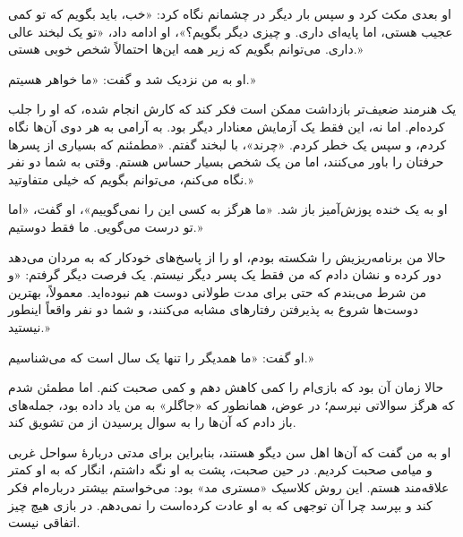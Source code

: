 او بعدی مکث کرد و سپس بار دیگر در چشمانم نگاه کرد: «خب، باید بگویم که تو کمی عجیب هستی، اما پایه‌ای داری. و چیزی دیگر بگویم؟»، او ادامه داد، «تو یک لبخند عالی داری. می‌توانم بگویم که زیر همه این‌ها احتمالاً شخص خوبی هستی.»

او به من نزدیک شد و گفت: «ما خواهر هسیتم.»

یک هنرمند ضعیف‌تر بازداشت ممکن است فکر کند که کارش انجام شده، که او را جلب کرده‌ام. اما نه، این فقط یک آزمایش معنادار دیگر بود. به آرامی به هر دوی آن‌ها نگاه کردم، و سپس یک خطر کردم. «چرند»، با لبخند گفتم. «مطمئنم که بسیاری از پسرها حرفتان را باور می‌کنند، اما من یک شخص بسیار حساس هستم. وقتی به شما دو نفر نگاه می‌کنم، می‌توانم بگویم که خیلی متفاوتید.»

او به یک خنده پوزش‌آمیز باز شد. «ما هرگز به کسی این را نمی‌گوییم»، او گفت، «اما تو درست می‌گویی. ما فقط دوستیم.»

حالا من برنامه‌ریزیش را شکسته بودم، او را از پاسخ‌های خودکار که به مردان می‌دهد دور کرده و نشان دادم که من فقط یک پسر دیگر نیستم. یک فرصت دیگر گرفتم: «و من شرط می‌بندم که حتی برای مدت طولانی دوست هم نبوده‌اید. معمولاً، بهترین دوست‌ها شروع به پذیرفتن رفتارهای مشابه می‌کنند، و شما دو نفر واقعاً اینطور نیستید.»

او گفت: «ما همدیگر را تنها یک سال است که می‌شناسیم.»

حالا زمان آن بود که بازی‌ام را کمی کاهش دهم و کمی صحبت کنم. اما مطمئن شدم که هرگز سوالاتی نپرسم؛ در عوض، همانطور که «جاگلر» به من یاد داده بود، جمله‌های باز دادم که آن‌ها را به سوال پرسیدن از من تشویق کند.

او به من گفت که آن‌ها اهل سن دیگو هستند، بنابراین برای مدتی دربارهٔ سواحل غربی و میامی صحبت کردیم. در حین صحبت، پشت به او نگه داشتم، انگار که به او کمتر علاقه‌مند هستم. این روش کلاسیک «مستری مد» بود: می‌خواستم بیشتر درباره‌ام فکر کند و بپرسد چرا آن توجهی که به او عادت کرده‌است را نمی‌دهم. در بازی هیچ چیز اتفاقی نیست.